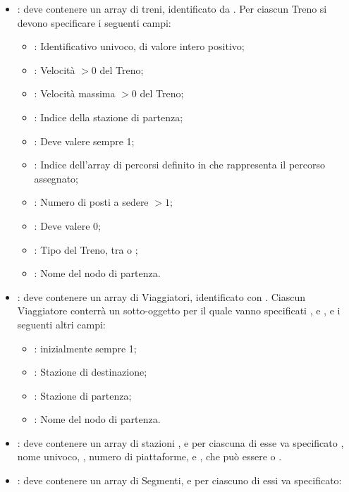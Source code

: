\begin{itemize}
		\item {}: deve contenere un array di treni, identificato da . Per ciascun Treno si devono specificare i seguenti campi:
			\begin{itemize}
				\item {} : Identificativo univoco, di valore intero positivo;
				\item {}: Velocità $> 0$ del Treno;
				\item {}: Velocità massima $> 0$ del Treno;
				\item {}: Indice della stazione di partenza;
				\item {}: Deve valere sempre 1;
				\item {}: Indice dell'array di percorsi definito in  che rappresenta il percorso assegnato;
				\item {}: Numero di posti a sedere $> 1$;
				\item {}: Deve valere 0;
				\item {}: Tipo del Treno, tra  o ;
				\item {}: Nome del nodo di partenza.
			\end{itemize}
		\item {}: deve contenere un array di Viaggiatori, identificato con . Ciascun Viaggiatore conterrà un sotto-oggetto  per il quale vanno specificati ,  e , e i seguenti altri campi:
			\begin{itemize}
				\item {}: inizialmente sempre 1;
				\item {}: Stazione di destinazione;
				\item {}: Stazione di partenza;
				\item {}: Nome del nodo di partenza.
			\end{itemize}
		\item {}: deve contenere un array di stazioni , e per ciascuna di esse va specificato , nome univoco, , numero di piattaforme, e , che può essere  o . 
		\item {}: deve contenere un array  di Segmenti, e per ciascuno di essi va specificato:

\end{itemize}
